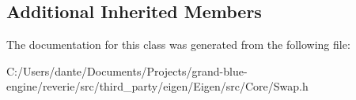 \subsection*{Additional Inherited Members}


The documentation for this class was generated from the following file\+:\begin{DoxyCompactItemize}
\item 
C\+:/\+Users/dante/\+Documents/\+Projects/grand-\/blue-\/engine/reverie/src/third\+\_\+party/eigen/\+Eigen/src/\+Core/Swap.\+h\end{DoxyCompactItemize}
